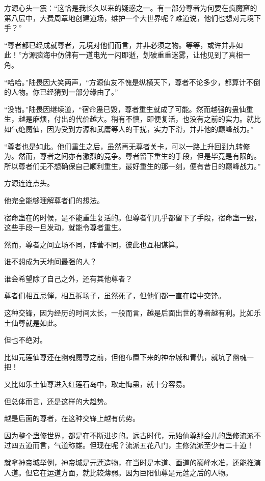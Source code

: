 \begin{this_body}
方源心头一震：“这恰是我长久以来的疑惑之一。有一部分尊者为何要在疯魔窟的第八层中，大费周章地创建道场，维护一个大世界呢？难道说，他们也想对元境下手？”

“尊者都已经成就尊者，元境对他们而言，并非必须之物。等等，或许并非如此！”方源脑海中仿佛有一道电光一闪即逝，划破重重迷雾，让他见到了真相一角。

“哈哈。”陆畏因大笑两声，“方源仙友不愧是纵横天下，尊者不论多少，都算计不倒的人物。你已经猜到一部分缘由了。”

“没错。”陆畏因继续道，“宿命蛊已毁，尊者重生就成了可能。然而越强的蛊仙重生，越是麻烦，付出的代价越大。稍有不慎，即便复活，也没有之前的实力。就比如气绝魔仙，因为受到方源和武庸等人的干扰，实力下滑，并非他的巅峰战力。”

“尊者也是如此。他们重生之后，虽然再无尊者关卡，可以一路上升回到九转修为。然而，尊者之间亦有激烈的竞争。尊者留下重生的手段，但是毕竟是有限的。所以尊者们无不想确保自己顺利重生，最好重生的那一刻，便有昔日的巅峰战力。”

方源连连点头。

他完全能够理解尊者们的想法。

宿命蛊在的时候，是不能重生复活的。但尊者们几乎都留下了手段，宿命蛊一毁，这些手段一旦发动，就能令尊者重生。

然而，尊者之间立场不同，阵营不同，彼此也互相谋算。

谁不想成为天地间最强的人？

谁会希望除了自己之外，还有其他尊者？

尊者们相互忌惮，相互拆场子，虽然死了，但他们都一直在暗中交锋。

这种交锋，因为经历的时间太长，一般而言，越是后面出世的尊者越有利。比如乐土仙尊就是如此。

但也不绝对。

比如元莲仙尊还在幽魂魔尊之前，但他布置下来的神帝城和青仇，就坑了幽魂一把！

又比如乐土仙尊进入红莲石岛中，取走悔蛊，就十分容易。

但总体而言，还是这样的大趋势。

越是后面的尊者，在这种交锋上越有优势。

因为整个蛊修世界，都是在不断进步的。远古时代，元始仙尊那会儿的蛊修流派不过四五道而言，气道称雄。但现在呢？流派五花八门，主修流派至少有二十道！

就拿神帝城举例，神帝城是元莲造物，在当时是木道、画道的巅峰水准，还能推演人道。但它在运道方面，就比较薄弱。因为巨阳仙尊是元莲之后的人物。


\end{this_body}
